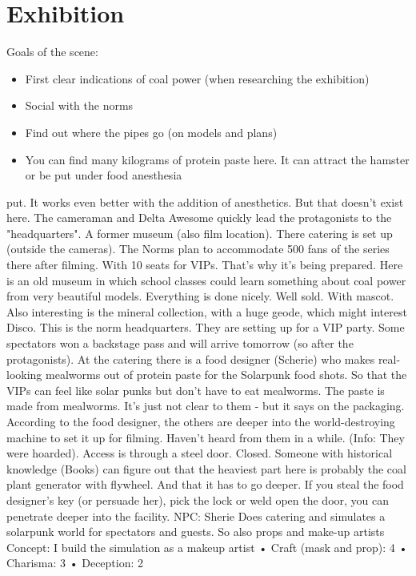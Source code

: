 \section{Exhibition}
Goals of the scene:
\begin{itemize}
\item First clear indications of coal power (when researching the exhibition)
\item Social with the norms
\item Find out where the pipes go (on models and plans)
\item You can find many kilograms of protein paste here. It can attract the hamster or be put under food anesthesia
\end{itemize}
put. It works even better with the addition of anesthetics. But that doesn't exist here.
The cameraman and Delta Awesome quickly lead the protagonists to the "headquarters". A former museum (also film
location). There catering is set up (outside the cameras). The Norms plan to accommodate 500 fans of the series there
after filming. With 10 seats for VIPs. That's why it's being prepared.
Here is an old museum in which school classes could learn something about coal power from very beautiful models.
Everything is done nicely. Well sold. With mascot. Also interesting is the mineral collection, with a huge geode, which might
interest Disco.
This is the norm headquarters. They are setting up for a VIP party. Some spectators won a backstage pass and will arrive
tomorrow (so after the protagonists).
At the catering there is a food designer (Scherie) who makes real-looking mealworms out of protein paste for the Solarpunk
food shots. So that the VIPs can feel like solar punks but don't have to eat mealworms.
The paste is made from mealworms. It's just not clear to them - but it says on the packaging.
According to the food designer, the others are deeper into the world-destroying machine to set it up for filming. Haven't
heard from them in a while. (Info: They were hoarded). Access is through a steel door. Closed.
Someone with historical knowledge (Books) can figure out that the heaviest part here is probably the coal plant generator
with flywheel. And that it has to go deeper.
If you steal the food designer's key (or persuade her), pick the lock or weld open the door, you can penetrate deeper into
the facility.
NPC: Sherie
Does catering and simulates a solarpunk world for spectators and guests. So also props and make-up artists
Concept: I build the simulation as a makeup artist
• Craft (mask and prop): 4
• Charisma: 3
• Deception: 2


